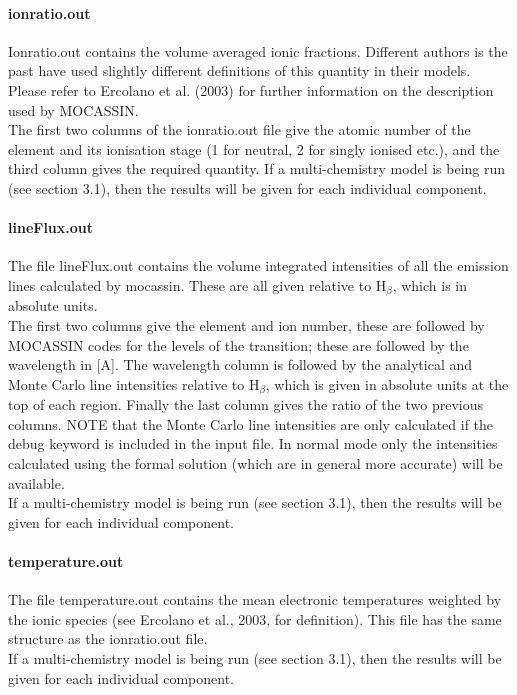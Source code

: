 \documentclass[11pt]{article}
\begin{document}
\paragraph{    ionratio.out}
    Ionratio.out contains the volume averaged ionic fractions. Different authors 
    is the past have used slightly different definitions of this quantity in their 
    models. Please refer to Ercolano et al. (2003) for further information on the 
    description used by MOCASSIN. \\
    The first two columns of the ionratio.out file give the atomic number of the 
    element and its ionisation stage (1 for neutral, 2 for singly ionised etc.), 
    and the third column gives the required quantity.
    If a multi-chemistry model is being run (see section 3.1), then the results 
    will be given for each individual component. \\


\paragraph{    lineFlux.out}
    The file lineFlux.out contains the volume integrated intensities of all the 
    emission lines calculated by {\sc mocassin}. These are all given relative to H$_{\beta}$, 
    which is in absolute units. \\
    The first two columns give the element and ion number, these are 
    followed by MOCASSIN codes for the levels of the transition; these are followed 
    by the wavelength in [A]. The wavelength column is followed by the analytical 
    and Monte Carlo line intensities relative to H$_{\beta}$, which is given in absolute
    units at the top of each region. Finally the last column gives the ratio of 
    the two previous columns. NOTE that the Monte Carlo line intensities are only 
    calculated if the debug keyword is included in the input file. In normal mode
    only the intensities calculated using the formal solution (which are in general
    more accurate) will be available.\\
    If a multi-chemistry model is being run (see section 3.1), then the results 
    will be given for each individual component. \\

    
\paragraph{    temperature.out }
    The file temperature.out contains the mean electronic temperatures weighted by 
    the ionic species (see Ercolano et al., 2003, for definition). This file has the
    same structure as the ionratio.out file. \\
    If a multi-chemistry model is being run (see section 3.1), then the results 
    will be given for each individual component.\\ 
\end{document}
